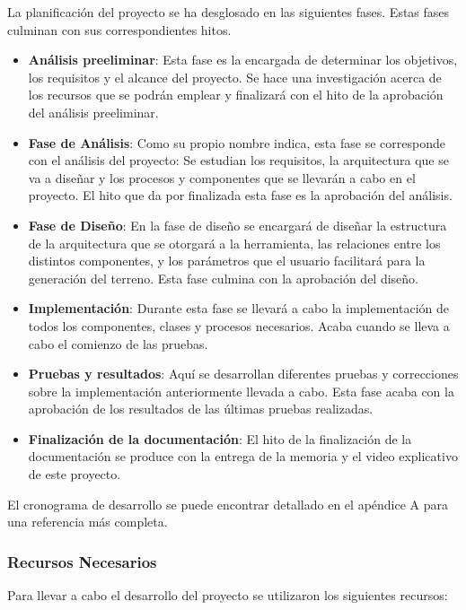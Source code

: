 La planificación del proyecto se ha desglosado en las siguientes fases. Estas fases culminan con sus correspondientes hitos.
\begin{itemize}
    \item \textbf{Análisis preeliminar}: Esta fase es la encargada de determinar los objetivos, los requisitos y el alcance del proyecto. Se hace una investigación acerca de los recursos que se podrán emplear y finalizará con el hito de la aprobación del análisis preeliminar.
    \item \textbf{Fase de Análisis}: Como su propio nombre indica, esta fase se corresponde con el análisis del proyecto: Se estudian los requisitos, la arquitectura que se va a diseñar y los procesos y componentes que se llevarán a cabo en el proyecto. El hito que da por finalizada esta fase es la aprobación del análisis.
    \item \textbf{Fase de Diseño}: En la fase de diseño se encargará de diseñar la estructura de la arquitectura que se otorgará a la herramienta, las relaciones entre los distintos componentes, y los parámetros que el usuario facilitará para la generación del terreno. Esta fase culmina con la aprobación del diseño.
    \item \textbf{Implementación}: Durante esta fase se llevará a cabo la implementación de todos los componentes, clases y procesos necesarios. Acaba cuando se lleva a cabo el comienzo de las pruebas.
    \item \textbf{Pruebas y resultados}: Aquí se desarrollan diferentes pruebas y correcciones sobre la implementación anteriormente llevada a cabo. Esta fase acaba con la aprobación de los resultados de las últimas pruebas realizadas.
    \item \textbf{Finalización de la documentación}: El hito de la finalización de la documentación se produce con la entrega de la memoria y el video explicativo de este proyecto.
\end{itemize}

El cronograma de desarrollo se puede encontrar detallado en el apéndice A para una referencia más completa.

\subsubsection{Recursos Necesarios}
Para llevar a cabo el desarrollo del proyecto se utilizaron los siguientes recursos:

